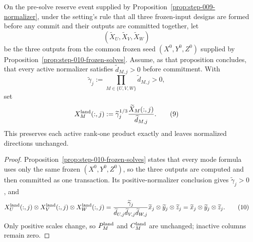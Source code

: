 \begin{proposition}\label{prop:step-010-rebalance}
On the pre-solve reserve event supplied by Proposition~\ref{prop:step-009-normalizer}, under
the setting's rule that all three frozen-input designs are formed before any
commit and their outputs are committed together, let
\[
(\widetilde X_U,\widetilde X_V,\widetilde X_W)
\]
be the three outputs from the common frozen seed
\((X^0,Y^0,Z^0)\) supplied by
Proposition~\ref{prop:step-010-frozen-solves}.  Assume, as that proposition
concludes, that every active normalizer satisfies
\(\widetilde d_{M,j}>0\) before commitment.  With
\[
\widetilde\gamma_j:=\prod_{M\in\{U,V,W\}}\widetilde d_{M,j}>0,
\]
set
\[
X_M^{\rm land}(:,j):=\widetilde\gamma_j^{1/3}
\frac{\widetilde X_M(:,j)}{\widetilde d_{M,j}}. \tag{9}
\]
This preserves each active rank-one product exactly and leaves normalized
directions unchanged.

\begin{proof}
Proposition~\ref{prop:step-010-frozen-solves}
states that every mode formula uses only the same frozen
\((X^0,Y^0,Z^0)\), so the three outputs are computed and then committed as
one transaction.  Its positive-normalizer conclusion gives
\(\widetilde\gamma_j>0\), and
\[
X_U^{\rm land}(:,j)\otimes X_V^{\rm land}(:,j)\otimes X_W^{\rm land}(:,j)
=\frac{\widetilde\gamma_j}
{\widetilde d_{U,j}\widetilde d_{V,j}\widetilde d_{W,j}}
\widetilde x_j\otimes\widetilde y_j\otimes\widetilde z_j
=\widetilde x_j\otimes\widetilde y_j\otimes\widetilde z_j. \tag{10}
\]
Only positive scales change, so \(P_M^{\rm land}\) and \(C_M^{\rm land}\)
are unchanged; inactive columns remain zero.


\end{proof}
\end{proposition}
